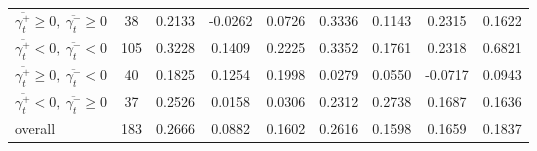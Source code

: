 \begin{tabular}{
  l *{8}{S[table-format=-1.3,table-space-text-post=***]}
}
\toprule
{} &   &  {} &  {} &  {} &  {} &  {} &  {} &   \\
\midrule
$\overline{\gamma^+_t} \geq 0, \ \overline{\gamma^-_t} \geq 0$    &     38 &          0.2133 &         -0.0262 &          0.0726 &         0.3336 &         0.1143 &         0.2315 &        0.1622 \\
$\overline{\gamma^+_t} < 0, \ \overline{\gamma^-_t} < 0$ &    105 &          0.3228 &          0.1409 &          0.2225 &         0.3352 &         0.1761 &         0.2318 &        0.6821 \\
$\overline{\gamma^+_t} \geq 0, \ \overline{\gamma^-_t} < 0$   &     40 &          0.1825 &          0.1254 &          0.1998 &         0.0279 &         0.0550 &        -0.0717 &        0.0943 \\
$\overline{\gamma^+_t} < 0, \ \overline{\gamma^-_t} \geq 0$ &     37 &          0.2526 &          0.0158 &          0.0306 &         0.2312 &         0.2738 &         0.1687 &        0.1636 \\
overall  &    183 &          0.2666 &          0.0882 &          0.1602 &         0.2616 &         0.1598 &         0.1659 &        0.1837 \\
\bottomrule
\end{tabular}
